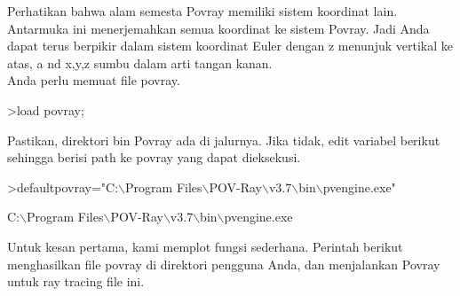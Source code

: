\documentclass{article}
\begin{document}
\begin{eulernotebook}
\begin{eulercomment}
Perhatikan bahwa alam semesta Povray memiliki sistem koordinat lain.
Antarmuka ini menerjemahkan semua koordinat ke sistem Povray. Jadi
Anda dapat terus berpikir dalam sistem koordinat Euler dengan z
menunjuk vertikal ke atas, a nd x,y,z sumbu dalam arti tangan kanan.\\
Anda perlu memuat file povray.
\end{eulercomment}
\begin{eulerprompt}
>load povray;
\end{eulerprompt}
\begin{eulercomment}
Pastikan, direktori bin Povray ada di jalurnya. Jika tidak, edit
variabel berikut sehingga berisi path ke povray yang dapat dieksekusi.
\end{eulercomment}
\begin{eulerprompt}
>defaultpovray="C:\(\backslash\)Program Files\(\backslash\)POV-Ray\(\backslash\)v3.7\(\backslash\)bin\(\backslash\)pvengine.exe"
\end{eulerprompt}
\begin{euleroutput}
  C:\(\backslash\)Program Files\(\backslash\)POV-Ray\(\backslash\)v3.7\(\backslash\)bin\(\backslash\)pvengine.exe
\end{euleroutput}
\begin{eulercomment}
Untuk kesan pertama, kami memplot fungsi sederhana. Perintah berikut
menghasilkan file povray di direktori pengguna Anda, dan menjalankan
Povray untuk ray tracing file ini.


\end{eulercomment}
\end{eulernotebook}
\end{document}
